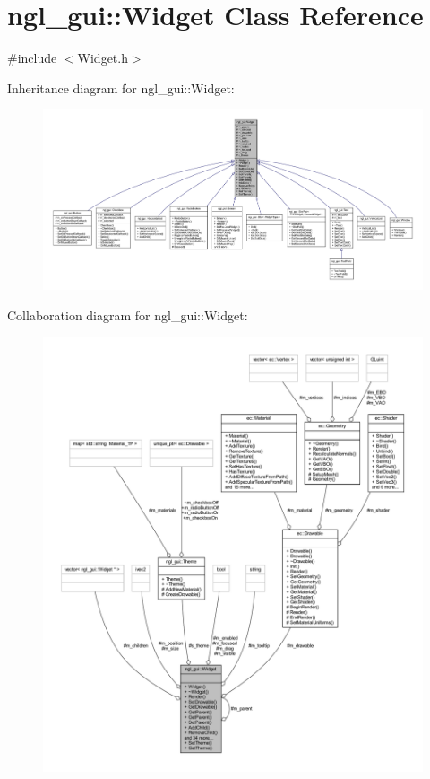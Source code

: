 \hypertarget{classngl__gui_1_1_widget}{}\section{ngl\+\_\+gui\+:\+:Widget Class Reference}
\label{classngl__gui_1_1_widget}


{\ttfamily \#include $<$Widget.\+h$>$}



Inheritance diagram for ngl\+\_\+gui\+:\+:Widget\+:\nopagebreak
\begin{figure}[H]
\begin{center}
\leavevmode
\includegraphics[width=350pt]{classngl__gui_1_1_widget__inherit__graph}
\end{center}
\end{figure}


Collaboration diagram for ngl\+\_\+gui\+:\+:Widget\+:
\nopagebreak
\begin{figure}[H]
\begin{center}
\leavevmode
\includegraphics[width=350pt]{classngl__gui_1_1_widget__coll__graph}
\end{center}
\end{figure}
